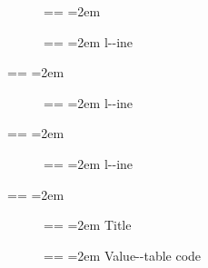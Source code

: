 \documentclass{book}
\makeatletter
\newcommand\GNUTexinfotablestyleemph[1]{{\normalfont\emph{#1}}}%
\newenvironment{GNUTexinfopreformatted}{%
  \par\obeylines\obeyspaces\frenchspacing
  \parskip=\z@\parindent=\z@}{}
\makeatother
\begin{document}
\begin{description}
\item[] \begin{GNUTexinfopreformatted}
\leftskip=2em\relax\ttfamily%
\end{GNUTexinfopreformatted}
\item[{\parbox[b]{\linewidth}{%
\textbf{a--strong}}}]
\begin{GNUTexinfopreformatted}
\leftskip=2em\relax\ttfamily%
l{-}{-}ine
\end{GNUTexinfopreformatted}
\end{description}
\begin{GNUTexinfopreformatted}
\leftskip=2em\relax\ttfamily%

\end{GNUTexinfopreformatted}
\begin{description}
\item[{\parbox[b]{\linewidth}{%
a--asis\\
\index[cp]{a--asis@\texttt{a{-}{-}asis}}%
b
\index[cp]{b@\texttt{b}}%
}}]
\begin{GNUTexinfopreformatted}
\leftskip=2em\relax\ttfamily%
l{-}{-}ine
\end{GNUTexinfopreformatted}
\end{description}
\begin{GNUTexinfopreformatted}
\leftskip=2em\relax\ttfamily%

\end{GNUTexinfopreformatted}
\begin{description}
\item[{\parbox[b]{\linewidth}{%
\GNUTexinfotablestyleemph{a}\\
\index[fn]{a@\texttt{a}}%
\index[cp]{index entry between item and itemx}%
\GNUTexinfotablestyleemph{b}
\index[fn]{b@\texttt{b}}%
}}]
\begin{GNUTexinfopreformatted}
\leftskip=2em\relax\ttfamily%
l{-}{-}ine
\end{GNUTexinfopreformatted}
\end{description}
\begin{GNUTexinfopreformatted}
\leftskip=2em\relax\ttfamily%

\end{GNUTexinfopreformatted}
\begin{description}
\item[] \begin{GNUTexinfopreformatted}
\leftskip=2em\relax\ttfamily%
Title
\end{GNUTexinfopreformatted}
\item[{\parbox[b]{\linewidth}{%
\texttt{a{-}{-}code}}}]
\begin{GNUTexinfopreformatted}
\leftskip=2em\relax\ttfamily%
Value{-}{-}table code
\end{GNUTexinfopreformatted}
\end{description}
\end{document}
